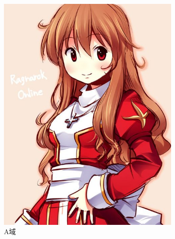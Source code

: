 \documentclass[twocolumn,11pt]{ctexart}
\begin{document}
\begin{figure}[htb]
    \centering
    \begin{subfigure}[b]{0.3\linewidth}
        \includegraphics[width=\linewidth]{hp.jpg}
        \caption{A域}
      \end{subfigure}
      \begin{subfigure}[b]{0.3\linewidth}

\end{subfigure}
\end{figure}
\end{document}
